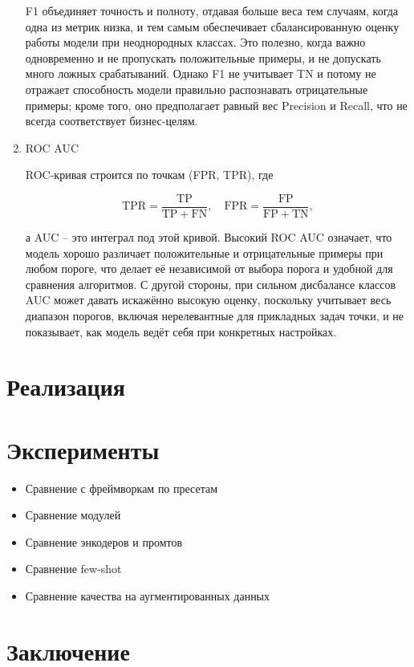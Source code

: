 \documentclass[14pt,a4paper,oneside,openany]{extbook}
\begin{document}
\begin{enumerate}
F1 объединяет точность и полноту, отдавая больше веса тем случаям, когда одна из метрик низка, и тем самым обеспечивает сбалансированную оценку работы модели при неоднородных классах. Это полезно, когда важно одновременно и не пропускать положительные примеры, и не допускать много ложных срабатываний. Однако F1 не учитывает TN и потому не отражает способность модели правильно распознавать отрицательные примеры; кроме того, оно предполагает равный вес Precision и Recall, что не всегда соответствует бизнес-целям.

\item ROC AUC

ROC-кривая строится по точкам (FPR, TPR), где

$$
   \mathrm{TPR} = \frac{\mathrm{TP}}{\mathrm{TP} + \mathrm{FN}},\quad
   \mathrm{FPR} = \frac{\mathrm{FP}}{\mathrm{FP} + \mathrm{TN}},
   $$

а AUC -- это интеграл под этой кривой. Высокий ROC AUC означает, что модель хорошо различает положительные и отрицательные примеры при любом пороге, что делает её независимой от выбора порога и удобной для сравнения алгоритмов. С другой стороны, при сильном дисбалансе классов AUC может давать искажённо высокую оценку, поскольку учитывает весь диапазон порогов, включая нерелевантные для прикладных задач точки, и не показывает, как модель ведёт себя при конкретных настройках.
\end{enumerate}
\chapter{Реализация}
\label{sec:orgd3cb742}

\chapter{Эксперименты}
\label{sec:org8b290bf}
\begin{itemize}
\item Сравнение с фреймворкам по пресетам
\item Сравнение модулей
\item Сравнение энкодеров и промтов
\item Сравнение few-shot
\item Сравнение качества на аугментированных данных
\end{itemize}
\chapter*{Заключение}
\label{sec:org4d74796}
\printbibliography[title=СПИСОК\spaceИСПОЛЬЗОВАНЫХ\spaceИСТОЧНИКОВ]
\end{document}
